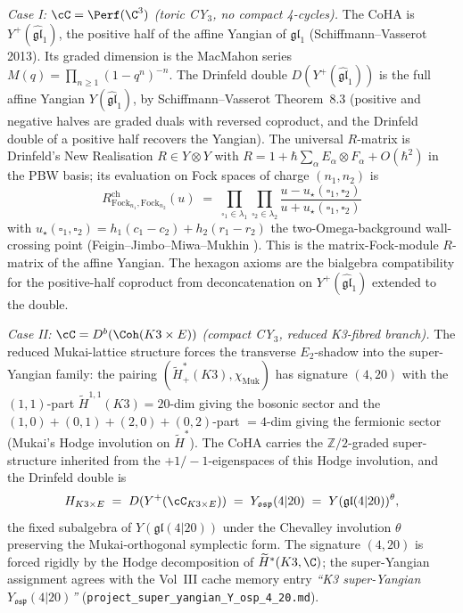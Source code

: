 \emph{Case I: $\cC = \Perf(\C^3)$ (toric CY$_3$, no compact 4-cycles).}
The CoHA is $Y^+(\widehat{\mathfrak{gl}}_1)$, the positive half of the
affine Yangian of $\mathfrak{gl}_1$ (Schiffmann--Vasserot 2013).  Its
graded dimension is the MacMahon series $M(q) = \prod_{n \geq 1}
(1-q^n)^{-n}$.  The Drinfeld double
$D(Y^+(\widehat{\mathfrak{gl}}_1))$ is the full affine Yangian
$Y(\widehat{\mathfrak{gl}}_1)$, by Schiffmann--Vasserot
\cite{SchiffmannVasserot2013} Theorem~8.3 (positive and negative halves
are graded duals with reversed coproduct, and the Drinfeld double of
a positive half recovers the Yangian).  The universal $R$-matrix is
Drinfeld's New Realisation $R \in Y \otimes Y$ with $R = 1 +
\hbar \sum_\alpha E_\alpha \otimes F_\alpha + O(\hbar^2)$ in the
PBW basis; its evaluation on Fock spaces of charge $(n_1, n_2)$ is
\[
 R^{\mathrm{ch}}_{\mathrm{Fock}_{n_1}, \mathrm{Fock}_{n_2}}(u) \;=\;
 \prod_{\square_1 \in \lambda_1} \prod_{\square_2 \in \lambda_2}
 \frac{u - u_\star(\square_1, \square_2)}{u + u_\star(\square_1,
 \square_2)}
\]
with $u_\star(\square_1, \square_2) = h_1 (c_1 - c_2) +
h_2 (r_1 - r_2)$ the two-Omega-background wall-crossing point
(Feigin--Jimbo--Miwa--Mukhin \cite{FJMM2017}).  This is the
matrix-Fock-module $R$-matrix of the affine Yangian.  The hexagon
axioms are the bialgebra compatibility for the positive-half coproduct
from deconcatenation on $Y^+(\widehat{\mathfrak{gl}}_1)$ extended to
the double.

\emph{Case II: $\cC = D^b(\Coh(K3 \times E))$ (compact CY$_3$, reduced
K3-fibred branch).}  The reduced Mukai-lattice structure forces the
transverse $E_2$-shadow into the super-Yangian family: the pairing
$(\widetilde H^*_+(K3), \chi_{\mathrm{Muk}})$ has signature $(4, 20)$
with the $(1,1)$-part $\widetilde H^{1,1}(K3) = 20$-dim giving the
bosonic sector and the $(1,0) + (0,1) + (2,0) + (0,2)$-part $= 4$-dim
giving the fermionic sector (Mukai's Hodge involution on
$\widetilde H^*$).  The CoHA carries the $\mathbb Z/2$-graded
super-structure inherited from the $+1/-1$-eigenspaces of this Hodge
involution, and the Drinfeld double is
\[
 H_{K3 \times E} \;=\; D(Y^+(\cC_{K3 \times E})) \;=\;
 Y_{\mathfrak{osp}}(4|20)
 \;=\; Y(\mathfrak{gl}(4|20))^\theta,
\]
the fixed subalgebra of $Y(\mathfrak{gl}(4|20))$ under the Chevalley
involution $\theta$ preserving the Mukai-orthogonal symplectic form.
The signature $(4, 20)$ is forced rigidly by the Hodge decomposition
of $\widetilde H^*(K3, \C)$; the super-Yangian assignment agrees with
the Vol~III cache memory entry \emph{``K3 super-Yangian
$Y_{\mathfrak{osp}}(4|20)$''}
(\texttt{project\_super\_yangian\_Y\_osp\_4\_20.md}).

